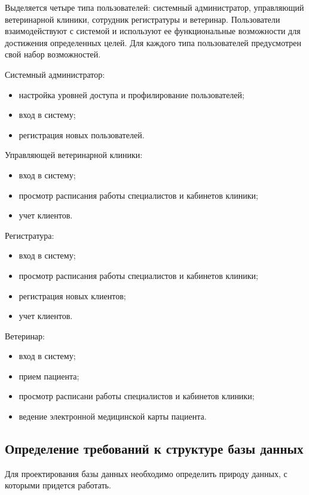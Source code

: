 \documentclass[a4paper,14pt]{article}
\begin{document}
Выделяется четыре типа пользователей: системный администратор, управляющий ветеринарной клиники, сотрудник регистратуры и ветеринар. Пользователи взаимодействуют с системой и используют ее функциональные возможности для достижения определенных
целей. Для каждого типа пользователей предусмотрен свой набор возможностей.

Системный администратор:

\begin{itemize}
	\item настройка уровней доступа и профилирование пользователей;
	\item вход в систему;
	\item регистрация новых пользователей.
\end{itemize}

Управляющей ветеринарной клиники:

\begin{itemize}
	\item вход в систему;
	\item просмотр расписания работы специалистов и кабинетов клиники;
	\item учет клиентов.
\end{itemize}

Регистратура:

\begin{itemize}
	\item вход в систему;
	\item просмотр расписания работы специалистов и кабинетов клиники;
	\item регистрация новых клиентов;
	\item учет клиентов.
\end{itemize}

Ветеринар:

\begin{itemize}
	\item вход в систему;
	\item прием пациента;
	\item просмотр расписани работы специалистов и кабинетов клиники;
	\item ведение электронной медицинской карты пациента.
\end{itemize}

\subsection{Определение требований к структуре базы данных}

Для проектирования базы данных необходимо определить природу данных, с которыми придется работать.
\end{document}
